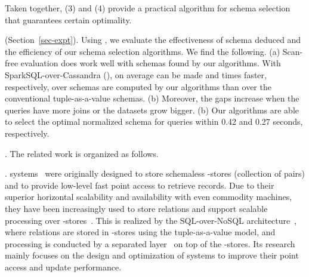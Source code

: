 Taken together, (3) and (4) provide a practical
  algorithm for schema selection that guarantees certain optimality.
  

 (Section~\ref{sec-expt}). 
Using , we
evaluate the effectiveness
of \baav schema deduced %
and the efficiency of
our schema selection algorithms.
We find the following.
(a) Scan-free evaluation does work well with \baav schemas found
by our algorithms. With SparkSQL-over-Cassandra (\soc), on average  can be made \xx and \xx
times faster, respectively, over \baav schemas
are computed by our algorithms than over the conventional
tuple-as-a-value schemas.
(b) 
Moreover, the gaps increase when the queries have more joins or the datasets grow bigger.
(b) Our algorithms are able to select
the optimal normalized \baav schema for 
queries within 0.42 and 0.27 seconds, respectively.


\vspace{0.6ex}

. The related work is organized as follows.

.
\kv systems~\cite{AmazonKV, FacebookKV, cassandra, bigtable,
hbase, F1} were originally designed to store schemaless
\kv-stores (\ie collection of \kv pairs) and to provide low-level
fast point access to retrieve \kv records. Due to %
their
superior horizontal scalability and availability with even
commodity machines, they have been increasingly used to store
relations and support scalable \SQL processing over
\kv-stores~\cite{spanner1,spanner,myrocks}. This is realized by
the SQL-over-NoSQL architecture~\cite{kvscan}, where relations
are stored in \kv-stores using the tuple-as-a-value model, and
\SQL processing is conducted by a separated \SQL
layer~\cite{cassandra,hive,phoenix,sparksql,drill,impala,kudu} on
top of the \kv-stores. Its research mainly focuses on the design
and optimization of \kv systems to improve their point access and
update performance.


